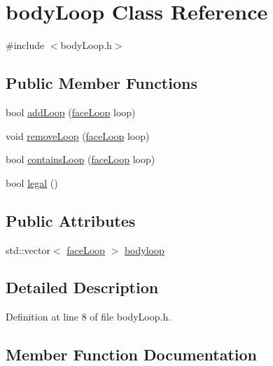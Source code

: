 \hypertarget{classbody_loop}{}\section{body\+Loop Class Reference}
\label{classbody_loop}


{\ttfamily \#include $<$body\+Loop.\+h$>$}

\subsection*{Public Member Functions}
\begin{DoxyCompactItemize}
\item 
bool \mbox{\hyperlink{classbody_loop_a246832022a7b7008903118462f24e263}{add\+Loop}} (\mbox{\hyperlink{classface_loop}{face\+Loop}} loop)
\item 
void \mbox{\hyperlink{classbody_loop_a963bee3f5118c89183c4eedaa39c3641}{remove\+Loop}} (\mbox{\hyperlink{classface_loop}{face\+Loop}} loop)
\item 
bool \mbox{\hyperlink{classbody_loop_afcbfd878ef953951d47c2564091b9442}{contains\+Loop}} (\mbox{\hyperlink{classface_loop}{face\+Loop}} loop)
\item 
bool \mbox{\hyperlink{classbody_loop_a328d9291b9baae26a01b39d9ff7fbd7d}{legal}} ()
\end{DoxyCompactItemize}
\subsection*{Public Attributes}
\begin{DoxyCompactItemize}
\item 
std\+::vector$<$ \mbox{\hyperlink{classface_loop}{face\+Loop}} $>$ \mbox{\hyperlink{classbody_loop_a44aae842c31a2872e898ee26eaa7cb52}{bodyloop}}
\end{DoxyCompactItemize}


\subsection{Detailed Description}


Definition at line 8 of file body\+Loop.\+h.



\subsection{Member Function Documentation}
\mbox{\label{classbody_loop_a246832022a7b7008903118462f24e263}} 

